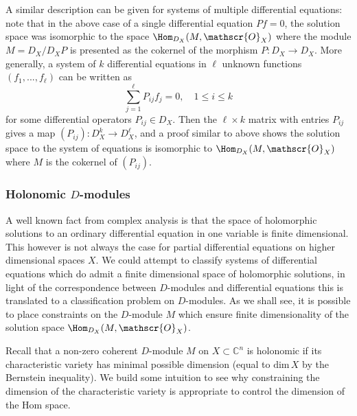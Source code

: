 A similar description can be given for systems of multiple differential
equations: note that in the above case of a single differential equation $Pf=0$, the
solution space was isomorphic to the space $\Hom_{D_X}(M, \mathscr{O}_X)$ where
the module $M= D_X/ D_X P$ is presented as the cokernel of the morphism $P:
D_X\to D_X$. More generally, a system of $k$ differential equations in $\ell$
unknown functions \((f_1,...,f_\ell)\) can be written as 
\[\sum_{j=1}^\ell P_{ij}f_j = 0,\quad 1\leq i \leq k\]
for some differential operators $P_{ij}\in D_X$. Then the
$\ell \times k$ matrix with entries $P_{ij}$ gives a map $(P_{ij}): D_X^k \to
D_X^\ell$, and a proof similar to above shows the solution space to the system
of equations is isomorphic to $\Hom_{D_X}(M, \mathscr{O}_X)$ where \(M\) is the
cokernel of \((P_{ij})\).

\subsubsection{Holonomic \texorpdfstring{$D$}{D}-modules} A well known fact from
complex analysis is that the space of holomorphic solutions to an ordinary
differential equation in one variable is finite dimensional. This however is not
always the case for partial differential equations on higher dimensional spaces
$X$. We could attempt to classify systems of differential equations which do
admit a finite dimensional space of holomorphic solutions, in light of the
correspondence between $D$-modules and differential equations this is translated
to a classification problem on \(D\)-modules. As we shall see, it is possible
to place constraints on the \(D\)-module \(M\) which ensure finite
dimensionality of the solution space \(\Hom_{D_X}(M,\mathscr{O}_X)\).

Recall that a non-zero coherent \(D\)-module \(M\) on \(X\subset \mathbb{C}^n\)
is holonomic if its characteristic variety has minimal possible dimension (equal
to \(\text{dim}\,X\) by the Bernstein inequality). We build some intuition to
see why constraining the dimension of the characteristic variety is appropriate
to control the dimension of the Hom space.

